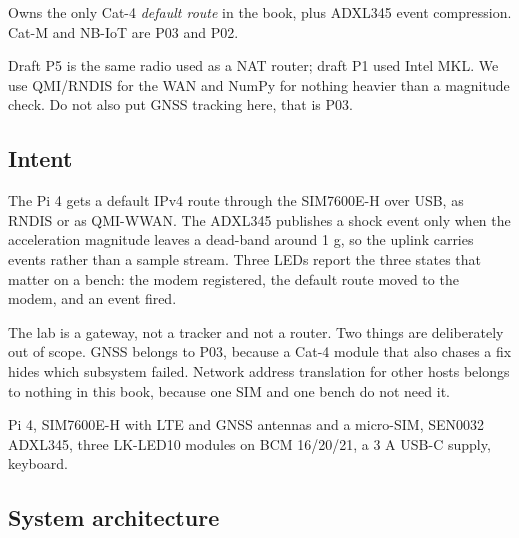 
\begin{unique}
Owns the only Cat-4 \emph{default route} in the book, plus ADXL345 event compression. Cat-M and NB-IoT are P03 and P02.
\end{unique}

\begin{blueprint}
Draft P5 is the same radio used as a NAT router; draft P1 used Intel MKL. We use QMI/RNDIS for the WAN and NumPy for nothing heavier than a magnitude check. Do not also put GNSS tracking here, that is P03.
\end{blueprint}

\subsection*{Intent}

The Pi 4 gets a default IPv4 route through the SIM7600E-H over USB, as RNDIS or as QMI-WWAN. The ADXL345 publishes a shock event only when the acceleration magnitude leaves a dead-band around 1 g, so the uplink carries events rather than a sample stream. Three LEDs report the three states that matter on a bench: the modem registered, the default route moved to the modem, and an event fired.

The lab is a gateway, not a tracker and not a router. Two things are deliberately out of scope. GNSS belongs to P03, because a Cat-4 module that also chases a fix hides which subsystem failed. Network address translation for other hosts belongs to nothing in this book, because one SIM and one bench do not need it.

\begin{kit}
Pi 4, SIM7600E-H with LTE and GNSS antennas and a micro-SIM, SEN0032 ADXL345, three LK-LED10 modules on BCM 16/20/21, a 3 A USB-C supply, keyboard.
\end{kit}

\subsection*{System architecture}


